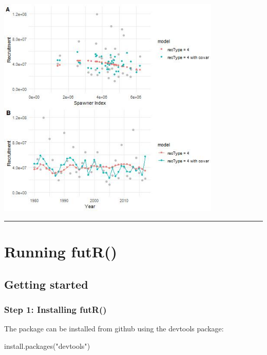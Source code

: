 \documentclass[
]{article}
\newenvironment{Shaded}{\begin{snugshade}}{\end{snugshade}}
\newcommand{\FunctionTok}[1]{\textcolor[rgb]{0.00,0.00,0.00}{#1}}
\newcommand{\NormalTok}[1]{#1}
\newcommand{\StringTok}[1]{\textcolor[rgb]{0.31,0.60,0.02}{#1}}
\begin{document}
\includegraphics[width=0.8\textwidth,height=\textheight]{../Figs/recplot5.jpg}

\begin{center}\rule{0.5\linewidth}{0.5pt}\end{center}

\hypertarget{running-futr}{%
\section{Running futR()}\label{running-futr}}

\hypertarget{getting-started}{%
\subsection{Getting started}\label{getting-started}}

\hypertarget{step-1-installing-futr}{%
\subsubsection{Step 1: Installing futR()}\label{step-1-installing-futr}}

The package can be installed from github using the devtools package:

\begin{Shaded}
\begin{Highlighting}[]
\FunctionTok{install.packages}\NormalTok{(}\StringTok{"devtools"}\NormalTok{)}
\end{Highlighting}
\end{Shaded}
\end{document}
